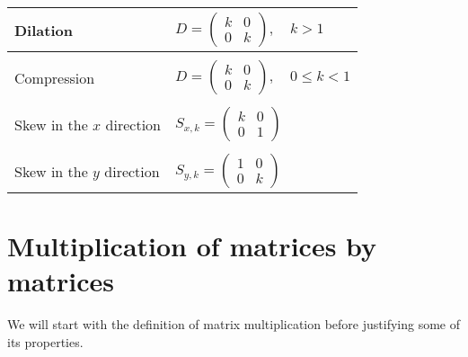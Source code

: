 \begin{table}[H]
\begin{center}
\begin{tabular}{l|l}
Dilation & $D = \begin{pmatrix} k & 0 \\ 0 & k \end{pmatrix}, \quad k>1$ \\[10pt] \hline \\[-7pt]
Compression & $D = \begin{pmatrix} k & 0 \\ 0 & k \end{pmatrix}, \quad 0\leq k<1$ \\[10pt] \hline \\[-7pt]
Skew in the $x$ direction & $S_{x,k} = \begin{pmatrix} k & 0 \\ 0 & 1 \end{pmatrix}$ \\[10pt] \hline \\[-7pt]
Skew in the $y$ direction & $S_{y,k} = \begin{pmatrix} 1 & 0 \\ 0 & k \end{pmatrix}$
\end{tabular}
\end{center}
\end{table}

\section{Multiplication of matrices by matrices}

We will start with the definition of matrix multiplication before justifying some of its properties.

